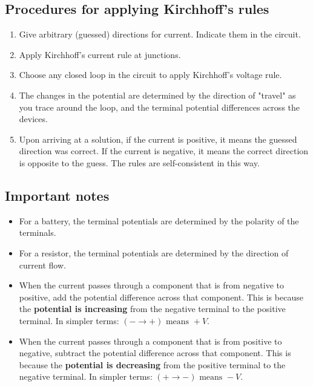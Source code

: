 \documentclass[11pt]{article}
\begin{document}
\subsection{Procedures for applying Kirchhoff's rules}
\label{sec:orgbb325a7}
\begin{enumerate}
\item Give arbitrary (guessed) directions for current. Indicate them in the circuit.
\item Apply Kirchhoff's current rule at junctions.
\item Choose any closed loop in the circuit to apply Kirchhoff's voltage rule.
\item The changes in the potential are determined by the direction of "travel" as you trace around the loop, and the terminal potential differences across the devices.
\item Upon arriving at a solution, if the current is positive, it means the guessed direction was correct. If the current is negative, it means the correct direction is opposite to the guess. The rules are self-consistent in this way.
\end{enumerate}
\subsection{Important notes}
\label{sec:orgc926ec0}
\begin{itemize}
\item For a battery, the terminal potentials are determined by the polarity of the terminals.
\item For a resistor, the terminal potentials are determined by the direction of current flow.
\item When the current passes through a component that is from negative to positive, add the potential difference across that component. This is because the \textbf{potential is increasing} from the negative terminal to the positive terminal. In simpler terms: \((- \rightarrow +) \text{ means } + V\).
\item When the current passes through a component that is from positive to negative, subtract the potential difference across that component. This is because the \textbf{potential is decreasing} from the positive terminal to the negative terminal. In simpler terms: \((+ \rightarrow -) \text{ means } - V\).
\end{itemize}

\newpage
\end{document}
